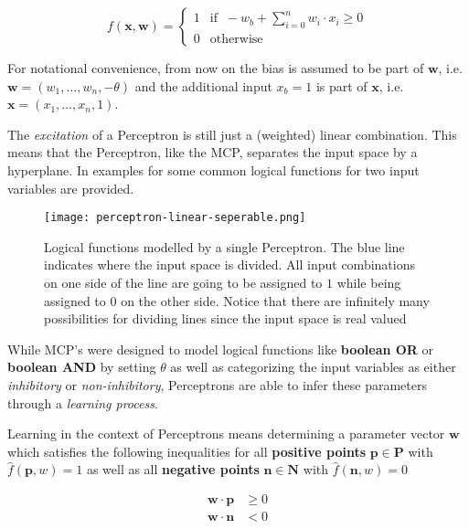 \begin{equation}
    \label{eq:full-perceptron}
    f(\bm{x}, \bm{w}) =
    \begin{cases}
        1 & \text{if } ~ -w_b + \sum_{i=0}^n w_i \cdot x_i \geq 0 \\
        0 & \text{otherwise}
    \end{cases}
\end{equation}

For notational convenience, from now on the bias is assumed to be part of $\bm{w}$, i.e. $\bm{w} = (w_1, \dots, w_n, -\theta)$ and the additional input $x_b = 1$ is part of $\bm{x}$, i.e. $\bm{x} = (x_1, \dots, x_n, 1)$.

The \textit{excitation} of a Perceptron is still just a (weighted) linear combination.
This means that the Perceptron, like the MCP, separates the input space by a hyperplane.
In  examples for some common logical functions for two input variables are provided.

\begin{figure}[htb!]
    \texttt{[image: perceptron-linear-seperable.png]}
    \caption{Logical functions modelled by a single Perceptron. The blue line indicates where the input space is divided. All input combinations on one side of the line are going to be assigned to $1$ while being assigned to $0$ on the other side. Notice that there are infinitely many possibilities for dividing lines since the input space is real valued \cite{rudolph_lecture_2018}}
    \label{fig:perceptron-logic}
\end{figure}

While MCP's were designed to model logical functions like \textbf{boolean OR} or \textbf{boolean AND} by setting $\theta$ as well as categorizing the input variables as either \textit{inhibitory} or \textit{non-inhibitory}, Perceptrons are able to infer these parameters through a \textit{learning process}.

Learning in the context of Perceptrons means determining a parameter vector $\bm{w}$ which satisfies the following inequalities for all \textbf{positive points} $\bm{p} \in \bm{P}$ with $\hat{f}(\bm{p}, w) = 1$ as well as all \textbf{negative points} $\bm{n} \in \bm{N}$ with $\hat{f}(\bm{n}, w) = 0$

\begin{equation}
    \begin{split}
        \bm{w} \cdot \bm{p} &\geq 0 \\
        \bm{w} \cdot \bm{n} &< 0
    \end{split}
\end{equation}

